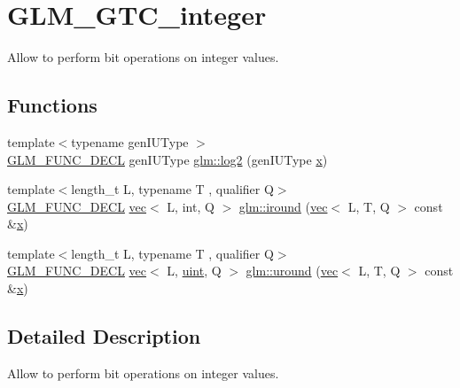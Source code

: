 \hypertarget{group__gtc__integer}{}\section{G\+L\+M\+\_\+\+G\+T\+C\+\_\+integer}
\label{group__gtc__integer}


Allow to perform bit operations on integer values.  


\subsection*{Functions}
\begin{DoxyCompactItemize}
\item 
{\footnotesize template$<$typename gen\+I\+U\+Type $>$ }\\\mbox{\hyperlink{setup_8hpp_ab2d052de21a70539923e9bcbf6e83a51}{G\+L\+M\+\_\+\+F\+U\+N\+C\+\_\+\+D\+E\+CL}} gen\+I\+U\+Type \mbox{\hyperlink{group__gtc__integer_ga9bd682e74bfacb005c735305207ec417}{glm\+::log2}} (gen\+I\+U\+Type \mbox{\hyperlink{_s_d_l__opengl_8h_ad0e63d0edcdbd3d79554076bf309fd47}{x}})
\item 
{\footnotesize template$<$length\+\_\+t L, typename T , qualifier Q$>$ }\\\mbox{\hyperlink{setup_8hpp_ab2d052de21a70539923e9bcbf6e83a51}{G\+L\+M\+\_\+\+F\+U\+N\+C\+\_\+\+D\+E\+CL}} \mbox{\hyperlink{structglm_1_1vec}{vec}}$<$ L, int, Q $>$ \mbox{\hyperlink{group__gtc__integer_ga57824268ebe13a922f1d69a5d37f637f}{glm\+::iround}} (\mbox{\hyperlink{structglm_1_1vec}{vec}}$<$ L, T, Q $>$ const \&\mbox{\hyperlink{_s_d_l__opengl_8h_ad0e63d0edcdbd3d79554076bf309fd47}{x}})
\item 
{\footnotesize template$<$length\+\_\+t L, typename T , qualifier Q$>$ }\\\mbox{\hyperlink{setup_8hpp_ab2d052de21a70539923e9bcbf6e83a51}{G\+L\+M\+\_\+\+F\+U\+N\+C\+\_\+\+D\+E\+CL}} \mbox{\hyperlink{structglm_1_1vec}{vec}}$<$ L, \mbox{\hyperlink{group__core__precision_ga4fd29415871152bfb5abd588334147c8}{uint}}, Q $>$ \mbox{\hyperlink{group__gtc__integer_ga6715b9d573972a0f7763d30d45bcaec4}{glm\+::uround}} (\mbox{\hyperlink{structglm_1_1vec}{vec}}$<$ L, T, Q $>$ const \&\mbox{\hyperlink{_s_d_l__opengl_8h_ad0e63d0edcdbd3d79554076bf309fd47}{x}})
\end{DoxyCompactItemize}


\subsection{Detailed Description}
Allow to perform bit operations on integer values. 

